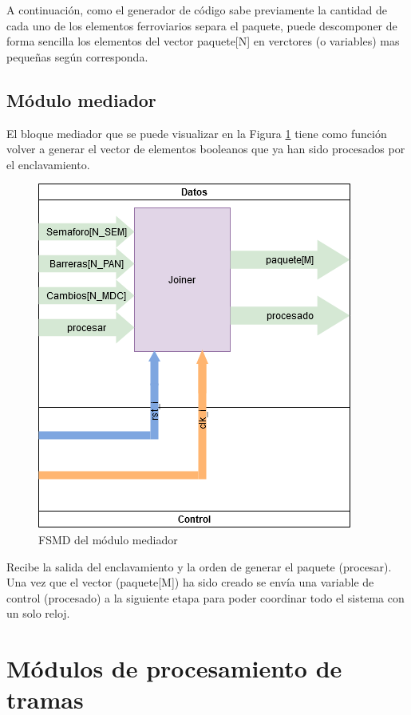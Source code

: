 		A continuación, como el generador de código sabe previamente la cantidad de cada uno de los elementos ferroviarios separa el paquete, puede descomponer de forma sencilla los elementos del vector paquete[N] en verctores (o variables) mas pequeñas según corresponda.
		
	\subsection{Módulo mediador}
	
		El bloque mediador que se puede visualizar en la Figura \ref{fig:FSMD_Mediador} tiene como función volver a generar el vector de elementos booleanos que ya han sido procesados por el enclavamiento.
		
		\begin{figure}[h]
		\centering
			\includegraphics[scale=.5]{./Figures/FSMD-Mediador}
			\caption{FSMD del módulo mediador}
			\label{fig:FSMD_Mediador}
		\end{figure}
		
		Recibe la salida del enclavamiento y la orden de generar el paquete (procesar). Una vez que el vector (paquete[M]) ha sido creado se envía una variable de control (procesado) a la siguiente etapa para poder coordinar todo el sistema con un solo reloj.
		


\section{Módulos de procesamiento de tramas}

